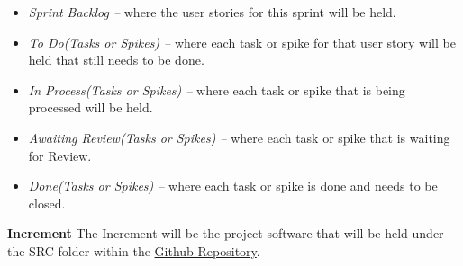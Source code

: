 \begin{itemize}
    \item \textit{Sprint Backlog --} where the user stories for this sprint will be held.
    \item \textit{To Do(Tasks or Spikes) -- } where each task or spike for that user story will be held that still needs 
                                              to be done.
    \item \textit{In Process(Tasks or Spikes) -- } where each task or spike that is being processed will be held.
    \item \textit{Awaiting Review(Tasks or Spikes) -- } where each task or spike that is waiting for Review.
    \item \textit{Done(Tasks or Spikes) -- } where each task or spike is done and needs to be closed.
\end{itemize}

\textbf{Increment}\newline
The Increment will be the project software that will be held under the SRC folder within the 
\href{https://github.com/TheRealShoxie/Interactive-Robot-Chess}{\color{blue}Github Repository}.